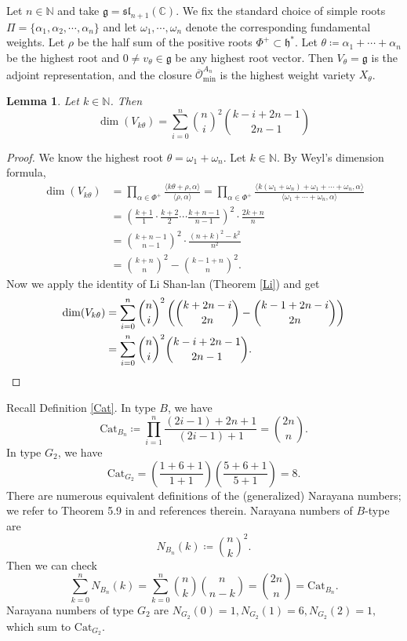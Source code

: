 \documentclass[12pt]{extarticle}
\theoremstyle{plain}
\newtheorem{lemm}[theo]{Lemma}
\theoremstyle{definition}
\theoremstyle{remark}
\newcommand{\Ominbar}{\overline{\mathcal{O}}_\textrm{min}}
\newcommand{\Cat}{\mathrm{Cat}}
\newcommand{\slnn}{\mathfrak{sl}_{n+1}}
\newcommand{\Lieg}{\mathfrak{g}}
\newcommand{\Lieh}{\mathfrak{h}}
\newcommand{\N}{\mathbb{N}}
\newcommand{\C}{\mathbb{C}}
\begin{document}
Let $n\in\N$ and take $\Lieg=\slnn(\C)$. We fix the standard choice of simple roots $\Pi=\{\alpha_1,\alpha_2,\cdots,\alpha_{n}\}$ and let $\omega_1,\cdots,\omega_{n}$ denote the corresponding fundamental weights.
Let $\rho$ be the half sum of the positive roots $\Phi^+\subset\Lieh^*$. Let $\theta\coloneqq\alpha_1+\cdots+\alpha_n$ be the highest root and $0\neq v_\theta\in\Lieg$ be any highest root vector. Then $V_\theta=\Lieg$ is the adjoint representation, and the closure $\Ominbar^{A_n}$ is the highest weight variety $X_{\theta}$.






\begin{lemm}\label{dimrep2} Let $k\in\N$. Then
    $$\dim(V_{k\theta})=\sum_{i=0}^n\binom{n}{i}^2\binom{k-i+2n-1}{2n-1}$$
\end{lemm}
\begin{proof} We know the highest root $\theta=\omega_1+\omega_n$. Let $k\in\N$. By Weyl's dimension formula, 
\begin{align*}
   \dim(V_{k\theta})& =\prod_{\alpha\in\Phi^+}\frac{\langle k\theta+\rho,\alpha\rangle}{\langle\rho,\alpha\rangle}=\prod_{\alpha\in\Phi^+}\frac{\langle k(\omega_1+\omega_n)+\omega_1+\cdots+\omega_n,\alpha\rangle}{\langle\omega_1+\cdots+\omega_n,\alpha\rangle}\\
   & =\left(\frac{k+1}{1}\cdot\frac{k+2}{2}\cdots\frac{k+n-1}{n-1}\right)^2\cdot\frac{2k+n}{n}\\
   & =\binom{k+n-1}{n-1}^2\cdot\frac{(n+k)^2-k^2}{n^2}\\
   & =\binom{k+n}{n}^2-\binom{k-1+n}{n}^2.
\end{align*}
Now we apply the identity of Li Shan-lan (Theorem \ref{Li}) and get
\begin{align*}
\dim(V_{k\theta})
&=\sum_{i=0}^n\binom{n}{i}^2\left(\binom{k+2n-i}{2n}-\binom{k-1+2n-i}{2n}\right) \\
&=\sum_{i=0}^n\binom{n}{i}^2\binom{k-i+2n-1}{2n-1}.\qedhere
\end{align*}
\end{proof}

Recall Definition \ref{Cat}.
In type $B$, we have
$$
    \Cat_{B_n}\coloneqq\prod_{i=1}^{n}\frac{(2i-1)+2n+1}{(2i-1)+1}=\binom{2n}{n}.
$$
In type $G_2$, we have
$$
    \Cat_{G_2}=\left(\frac{1+6+1}{1+1}\right)\left(\frac{5+6+1}{5+1}\right)=8.
$$
    There are numerous equivalent definitions of the (generalized) Narayana numbers; we refer to Theorem 5.9 in \cite{FominReading} and references therein. 
    Narayana numbers of $B$-type are
$$
    \displaystyle N_{B_n}(k)\coloneqq\binom{n}{k}^2.
$$
Then we can check
$$
    \sum_{k=0}^n N_{B_n}(k)=\sum_{k=0}^n\binom{n}{k}\binom{n}{n-k}=\binom{2n}{n}=\Cat_{B_n}.
$$
Narayana numbers of type $G_2$ are 
$
    N_{G_2}(0)=1, N_{G_2}(1)=6, N_{G_2}(2)=1,
$
which sum to $\Cat_{G_2}$.
\end{document}
